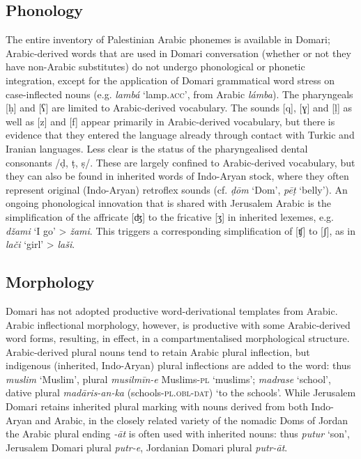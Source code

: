\documentclass[output=paper]{langsci/langscibook}
\begin{document}
\subsection{Phonology
}

The entire inventory of Palestinian Arabic phonemes is available in Domari; Arabic-derived words that are used in Domari conversation (whether or not they have non-Arabic substitutes) do not undergo phonological or phonetic integration, except for the application of Domari grammatical word stress on case-inflected nouns (e.g. \textit{lambá} ‘lamp.\textsc{acc}’, from Arabic \textit{lámba}). The pharyngeals [ḥ] and [{ʕ}] are limited to Arabic-derived vocabulary. The sounds [q], [{ɣ}] and [ḷ] as well as [z] and [f] appear primarily in Arabic-derived vocabulary, but there is evidence that they entered the language already through contact with Turkic and Iranian languages. Less clear is the status of the pharyngealised dental consonants /ḍ, ṭ, ṣ/. These are largely confined to Arabic-derived vocabulary, but they can also be found in inherited words of Indo-Aryan stock, where they often represent original (Indo-Aryan) retroflex sounds (cf. \textit{ḍōm} ‘Dom’, \textit{pēṭ} ‘belly’). An ongoing phonological innovation that is shared with Jerusalem Arabic is the simplification of the affricate [{ʤ}] to the fricative [{ʒ}] in inherited lexemes, e.g. \textit{džami} ‘I go’ > \textit{žami}. This triggers a corresponding simplification of [{ʧ}] to [{ʃ}], as in \textit{lači} ‘girl’ > \textit{laši}. 

\subsection{Morphology
}

Domari has not adopted productive word-derivational templates from Arabic. Arabic inflectional morphology, however, is productive with some Arabic-derived word forms, resulting, in effect, in a compartmentalised morphological structure. Arabic-derived plural nouns tend to retain Arabic plural inflection, but indigenous (inherited, Indo-Aryan) plural inflections are added to the word: thus \textit{muslim} ‘Muslim’, plural \textit{musilmīn-e} Muslims-\textsc{pl} \textsc{‘}muslims’; \textit{madrase} ‘school’, dative plural \textit{madāris-an-ka}  (schools-\textsc{pl.obl-dat}) ‘to the schools’. While Jerusalem Domari retains inherited plural marking with nouns derived from both Indo-Aryan and Arabic, in the closely related variety of the nomadic Doms of Jordan the Arabic plural ending \textit{-āt} is often used with inherited nouns: thus \textit{putur} ‘son’, Jerusalem Domari plural \textit{putr-e}, Jordanian Domari plural \textit{putr-āt}.
\end{document}
